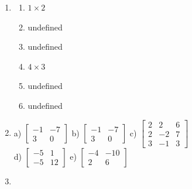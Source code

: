 \begin{enumerate}
\item \begin{enumerate}
\item $1 \times 2$
\item undefined
\item undefined
\item $4 \times 3$
\item undefined
\item undefined \end{enumerate}
\item a) $\left [\begin {array}{rr} -1&-7\\3&0\end {array}
\right ]$
b) $\left [\begin {array}{rr} -1&-7\\3&0\end {array}
\right ]$
c) $\left [\begin {array}{rrr} 2&2&6\\2&-2&7
\\3&-1&3\end {array}\right ]$
\\
d) $\left [\begin {array}{rr} -5&1\\-5&12\end {array} \right ]$ e)
$\left [\begin {array}{rr} -4&-10\\2&6\end {array} \right ]$
\item  \begin{enumerate} \item $7$, $\quad \left [\begin {array}{rr} 3&6\\2&4\end {array} \right ]$
\item $\left [\begin {array}{rr} 0&-6\\6&7\end {array}
\right ]$
\item  $\left [\begin {array}{rrr} -12&19\\7&-11\end {array}
\right ]$,  $\left [\begin {array}{rrr} 3&10\\2&9
\\-3&-7\end {array}\right ]$,  $\left [\begin {array}{rr} 23&-36\\20&-31

\end{array}
\end{enumerate}
\end{enumerate}
